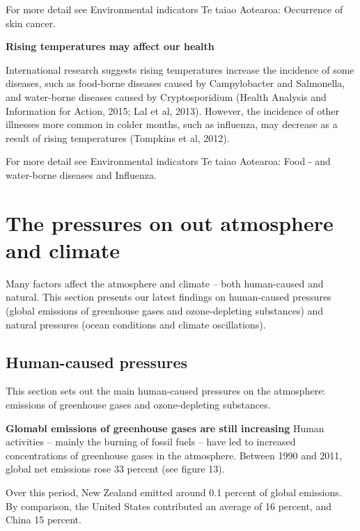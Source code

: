 \documentclass[11pt]{article} %
\begin{document}
For more detail see Environmental indicators Te taiao Aotearoa: Occurrence of skin cancer.

\textbf{Rising temperatures may affect our health}

International research suggests rising temperatures increase the incidence of some diseases, such as food-borne diseases caused by Campylobacter and Salmonella, and water-borne diseases caused by Cryptosporidium (Health Analysis and Information for Action, 2015; Lal et al, 2013). However, the incidence of other illnesses more common in colder months, such as influenza, may decrease as a result of rising temperatures (Tompkins et al, 2012).

For more detail see Environmental indicators Te taiao Aotearoa: Food - and water-borne diseases and Influenza.

\section{The pressures on out atmosphere and climate}

Many factors affect the atmosphere and climate – both human-caused and natural. This section presents our latest findings on human-caused pressures (global emissions of greenhouse gases and ozone-depleting substances) and natural pressures (ocean conditions and climate oscillations).

\subsection{Human-caused pressures}
This section sets out the main human-caused pressures on the atmosphere: emissions of greenhouse gases and ozone-depleting substances.

\textbf{Glomabl emissions of greenhouse gases are still increasing}
Human activities – mainly the burning of fossil fuels – have led to increased concentrations of greenhouse gases in the atmosphere. Between 1990 and 2011, global net emissions rose 33 percent (see figure 13).

Over this period, New Zealand emitted around 0.1 percent of global emissions. By comparison, the United States contributed an average of 16 percent, and China 15 percent.

\end{document}

